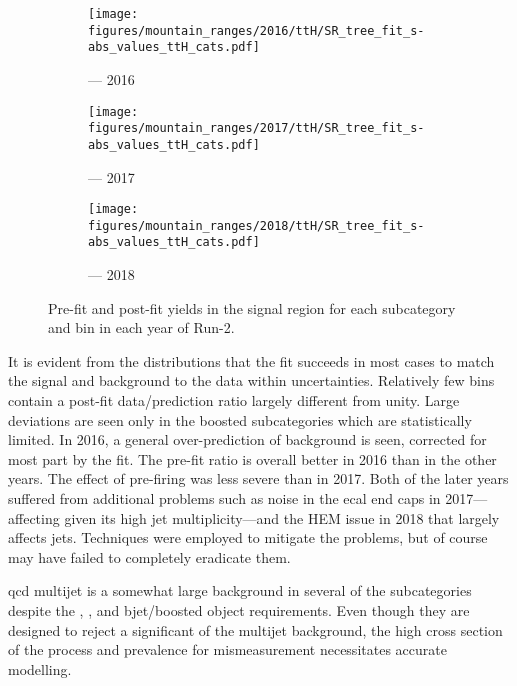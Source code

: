 \begin{figure}[htbp]
    \centering
    \begin{subfigure}[b]{0.9\textwidth}
        \texttt{[image: figures/mountain\_ranges/2016/ttH/SR\_tree\_fit\_s-abs\_values\_ttH\_cats.pdf]}
        \caption{\ttH --- 2016}
    \end{subfigure}

    \begin{subfigure}[b]{0.9\textwidth}
        \texttt{[image: figures/mountain\_ranges/2017/ttH/SR\_tree\_fit\_s-abs\_values\_ttH\_cats.pdf]}
        \caption{\ttH --- 2017}
    \end{subfigure}

    \begin{subfigure}[b]{0.9\textwidth}
        \texttt{[image: figures/mountain\_ranges/2018/ttH/SR\_tree\_fit\_s-abs\_values\_ttH\_cats.pdf]}
        \caption{\ttH --- 2018}
    \end{subfigure}
    \caption[Pre-fit and post-fit yields in the signal region for each \ttH subcategory and \ptmiss bin in each year of Run-2]{Pre-fit and post-fit yields in the signal region for each \ttH subcategory and \ptmiss bin in each year of Run-2.}
    \label{fig:htoinv_mountain_range_ttH_SR}
\end{figure}

It is evident from the distributions that the fit succeeds in most cases to match the signal and background to the data within uncertainties. Relatively few bins contain a post-fit data/prediction ratio largely different from unity. Large deviations are seen only in the \ttH boosted subcategories which are statistically limited. In 2016, a general over-prediction of background is seen, corrected for most part by the fit. The pre-fit ratio is overall better in 2016 than in the other years. The effect of pre-firing was less severe than in 2017. Both of the later years suffered from additional problems such as noise in the \acrshort{ecal} end caps in 2017---affecting \ttH given its high jet multiplicity---and the HEM issue in 2018 that largely affects \glspl{jet}. Techniques were employed to mitigate the problems, but of course may have failed to completely eradicate them.

\acrshort{qcd} multijet is a somewhat large background in several of the subcategories despite the \mindphi, \omegaTilde, and \gls{bjet}/boosted object requirements. Even though they are designed to reject a significant of the multijet background, the high cross section of the process and prevalence for mismeasurement necessitates accurate modelling.

